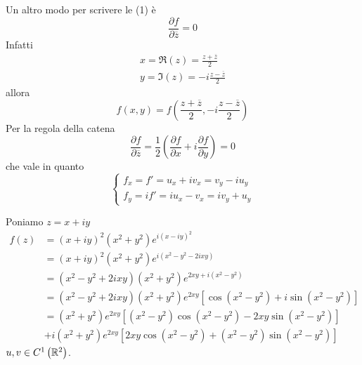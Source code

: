 \begin{rem}
Un altro modo per scrivere le (1) è
\begin{equation*}
\frac{\partial f}{\partial \overline{z}} =0
\end{equation*}
Infatti
\begin{equation*}
\begin{array}{ l }
x=\Re \left( z\right) =\frac{z+\overline{z}}{2}\\
y=\Im \left( z\right) =-i\frac{z-\overline{z}}{2}
\end{array}
\end{equation*}
allora
\begin{equation*}
f\left( x,y\right) =f\left(\frac{z+\overline{z}}{2} ,-i\frac{z-\overline{z}}{2}\right)
\end{equation*}
Per la regola della catena
\begin{equation*}
\frac{\partial f}{\partial \overline{z}} =\frac{1}{2}\left(\frac{\partial f}{\partial x} +i\frac{\partial f}{\partial y}\right) =0
\end{equation*}
che vale in quanto
\begin{equation*}
\begin{cases}
f_{x} =f'=u_{x} +iv_{x} =v_{y} -iu_{y}\\
f_{y} =if'=iu_{x} -v_{x} =iv_{y} +u_{y}
\end{cases}
\end{equation*}
\end{rem}
Poniamo $z=x+iy$
\begin{align*}
f\left( z\right) & =\left( x+iy\right)^{2}\left( x^{2} +y^{2}\right) e^{i\left( x-iy\right)^{2}}\\
 & =\left( x+iy\right)^{2}\left( x^{2} +y^{2}\right) e^{i\left( x^{2} -y^{2} -2ixy\right)}\\
 & =\left( x^{2} -y^{2} +2ixy\right)\left( x^{2} +y^{2}\right) e^{2xy+i\left( x^{2} -y^{2}\right)}\\
 & =\left( x^{2} -y^{2} +2ixy\right)\left( x^{2} +y^{2}\right) e^{2xy}\left[\cos\left( x^{2} -y^{2}\right) +i\sin\left( x^{2} -y^{2}\right)\right]\\
 & =\left( x^{2} +y^{2}\right) e^{2xy}\left[\left( x^{2} -y^{2}\right)\cos\left( x^{2} -y^{2}\right) -2xy\sin\left( x^{2} -y^{2}\right)\right]\\
 & +i\left( x^{2} +y^{2}\right) e^{2xy}\left[ 2xy\cos\left( x^{2} -y^{2}\right) +\left( x^{2} -y^{2}\right)\sin\left( x^{2} -y^{2}\right)\right]
\end{align*}
$u,v\in C^{1}\left(\mathbb{R} ^{2}\right)$.

